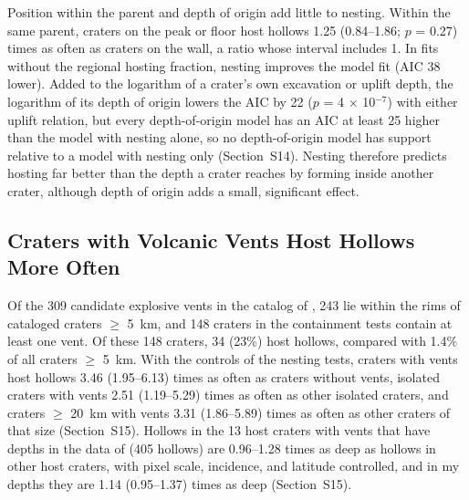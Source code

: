 \documentclass[article,review]{planetary}
\begin{document}
Position within the parent and depth of origin add little to nesting. Within the same parent, craters on the peak or floor host hollows 1.25 (0.84--1.86; $p$ = 0.27) times as often as craters on the wall, a ratio whose interval includes 1. In fits without the regional hosting fraction, nesting improves the model fit (AIC 38 lower). Added to the logarithm of a crater's own excavation or uplift depth, the logarithm of its depth of origin lowers the AIC by 22 ($p$ = 4 $\times$ 10$^{-7}$) with either uplift relation, but every depth-of-origin model has an AIC at least 25 higher than the model with nesting alone, so no depth-of-origin model has support relative to a model with nesting only (Section~S14). Nesting therefore predicts hosting far better than the depth a crater reaches by forming inside another crater, although depth of origin adds a small, significant effect.

\FloatBarrier
\subsection{Craters with Volcanic Vents Host Hollows More Often}
\label{sec:vents}
Of the 309 candidate explosive vents in the catalog of \textcite{pegg2021}, 243 lie within the rims of cataloged craters $\geq$ 5~km, and 148 craters in the containment tests contain at least one vent. Of these 148 craters, 34 (23\%) host hollows, compared with 1.4\% of all craters $\geq$ 5~km. With the controls of the nesting tests, craters with vents host hollows 3.46 (1.95--6.13) times as often as craters without vents, isolated craters with vents 2.51 (1.19--5.29) times as often as other isolated craters, and craters $\geq$ 20~km with vents 3.31 (1.86--5.89) times as often as other craters of that size (Section~S15). Hollows in the 13 host craters with vents that have depths in the data of \textcite{blewett2016} (405 hollows) are 0.96--1.28 times as deep as hollows in other host craters, with pixel scale, incidence, and latitude controlled, and in my depths they are 1.14 (0.95--1.37) times as deep (Section~S15).
\end{document}

